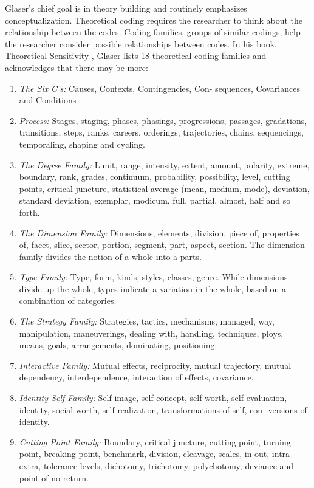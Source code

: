 Glaser's chief goal is in theory building and routinely emphasizes conceptualization. Theoretical coding requires the researcher to think about the relationship between the codes. Coding families, groups of similar codings, help the researcher consider possible relationships between codes.  In his book, Theoretical Sensitivity \cite{GlaserTheoreticalSensitivity}, Glaser lists 18 theoretical coding families and acknowledges that there may be more:
\begin{enumerate}
\item \textit{The Six C's:} Causes, Contexts, Contingencies, Con- sequences, Covariances and Conditions
\item \textit{Process:} Stages, staging, phases, phasings, progressions, passages, gradations, transitions, steps, ranks, careers, orderings, trajectories, chains, sequencings, temporaling, shaping and cycling.
\item \textit{The Degree Family:} Limit, range, intensity, extent, amount, polarity, extreme, boundary, rank, grades, continuum, probability, possibility, level, cutting points, critical juncture, statistical average (mean, medium, mode), deviation, standard deviation, exemplar, modicum, full, partial, almost, half and so forth.
\item \textit{The Dimension Family:} Dimensions, elements, division, piece of, properties of, facet, slice, sector, portion, segment, part, aspect, section. The dimension family divides the notion of a whole into a parts. 
\item \textit{Type Family:} Type, form, kinds, styles, classes, genre. While dimensions divide up the whole, types indicate a variation in the whole, based on a combination of categories. 
\item \textit{The Strategy Family:} Strategies, tactics, mechanisms, managed, way, manipulation, maneuverings, dealing with, handling, techniques, ploys, means, goals, arrangements, dominating, positioning. 
\item \textit{Interactive Family:} Mutual effects, reciprocity, mutual trajectory, mutual dependency, interdependence, interaction of effects, covariance. 
\item \textit{Identity-Self Family:} Self-image, self-concept, self-worth, self-evaluation, identity, social worth, self-realization, transformations of self, con- versions of identity.
\item \textit{Cutting Point Family:} Boundary, critical juncture, cutting point, turning point, breaking point, benchmark, division, cleavage, scales, in-out, intra-extra, tolerance levels, dichotomy, trichotomy, polychotomy, deviance and point of no return.

\end{enumerate}
